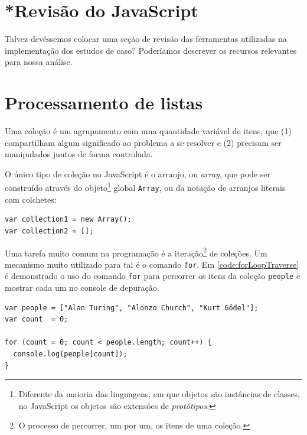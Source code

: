 \section{*Revisão do JavaScript}
\label{sec:revisao-do-javascript}
Talvez devêssemos colocar uma seção de revisão das ferramentas utilizadas na
implementação dos estudos de caso? Poderíamos descrever os recursos relevantes
para nossa análise.
\section{Processamento de listas}
\label{sec:processamento-de-listas}

Uma coleção é um agrupamento com uma quantidade variável de itens, que (1)
compartilham algum significado ao problema a se resolver e (2) precisam ser
manipulados juntos de forma controlada.

O único tipo de coleção no JavaScript é o arranjo, ou \emph{array}, que pode ser
construído através do objeto\footnote{Diferente da maioria das linguagens, em que objetos são
instâncias de classes, no JavaScript os objetos são extensões de \emph{protótipos}.} global \texttt{Array}, ou da
notação de arranjos literais com colchetes:

\begin{listing}[htbp]
\caption{Criando coleções}
\begin{verbatim}
var collection1 = new Array();
var collection2 = [];
\end{verbatim}
\end{listing}

Uma tarefa muito comum na programação é a iteração\footnote{O processo de percorrer, um por um, os itens de uma coleção.} de coleções.
Um mecanismo muito utilizado para tal é o comando \texttt{for}. Em
\ref{code:forLoopTraverse} é demonstrado o uso do comando \texttt{for} para
percorrer os itens da coleção \texttt{people} e mostrar cada um no console de
depuração.

\begin{listing}[htbp]
\caption{\label{code:forLoopTraverse}Percorrendo uma coleção com o laço \texttt{for}}
\begin{verbatim}
var people = ["Alan Turing", "Alonzo Church", "Kurt Gödel"];
var count  = 0;

for (count = 0; count < people.length; count++) {
  console.log(people[count]);
}
\end{verbatim}
\end{listing}
